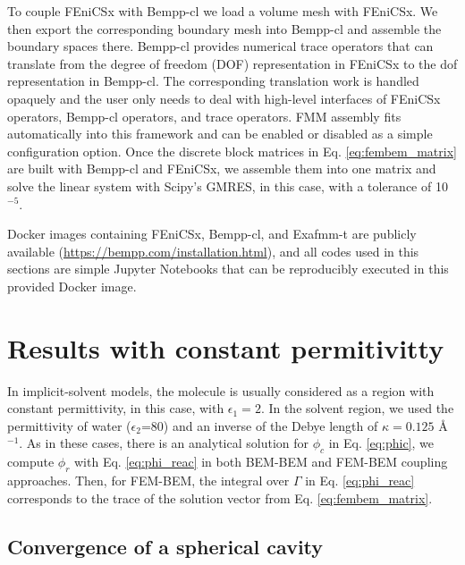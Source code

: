 To couple FEniCSx with Bempp-cl we load a volume mesh with FEniCSx. We then export the corresponding boundary mesh into Bempp-cl and assemble the boundary spaces there. Bempp-cl provides numerical trace operators that can translate from the degree of freedom (DOF) representation in FEniCSx to the dof representation in Bempp-cl. The corresponding translation work is handled opaquely and the user only needs to deal with high-level interfaces of FEniCSx operators, Bempp-cl operators, and trace operators. FMM assembly fits automatically into this framework and can be enabled or disabled as a simple configuration option.
Once the discrete block matrices in Eq. \eqref{eq:fembem_matrix} are built with Bempp-cl and FEniCSx, we assemble them into one matrix and solve the linear system with Scipy's\cite{2020SciPy-NMeth} GMRES, in this case, with a tolerance of 10$^{-5}$.

Docker images containing FEniCSx, Bempp-cl, and Exafmm-t are publicly available (\href{https://bempp.com/installation.html}{https://bempp.com/installation.html}), and all codes used in this sections are simple Jupyter Notebooks that can be reproducibly executed in this provided Docker image.

\section*{\sffamily \Large Results with constant permitivitty}

In implicit-solvent models, the molecule is usually considered as a region with constant permittivity, in this case, with $\epsilon_1=2$.
In the solvent region, we used the permittivity of water ($\epsilon_2$=80) and an inverse of the Debye length of $\kappa=0.125$ \AA$^{-1}$.
As in these cases, there is an analytical solution for $\phi_c$ in Eq. \eqref{eq:phic}, we compute $\phi_r$ with Eq. \eqref{eq:phi_reac} in both BEM-BEM and FEM-BEM coupling approaches. Then, for FEM-BEM, the integral over $\Gamma$ in Eq. \eqref{eq:phi_reac} corresponds to the trace of the solution vector from Eq. \eqref{eq:fembem_matrix}.

\subsection*{\sffamily \large Convergence of a spherical cavity}

